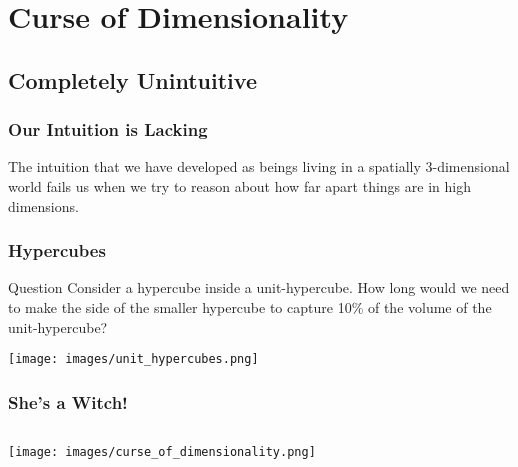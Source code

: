\documentclass{beamer}
\begin{document}
\section{Curse of Dimensionality}
\subsection{Completely Unintuitive}
\begin{frame}
  \frametitle{Our Intuition is Lacking}
  The intuition that we have developed as beings living in a spatially 3-dimensional world fails us when we try to reason about how far apart things are in high dimensions. \vspace{4mm}
\end{frame}

\begin{frame}
  \frametitle{Hypercubes}
  \begin{block}{Question}
    Consider a hypercube inside a unit-hypercube. How long would we need to make the side of the smaller hypercube to capture 10\% of the volume of the unit-hypercube?
  \end{block} \vspace{2mm} \pause

  \texttt{[image: images/unit\_hypercubes.png]}
\end{frame}
\begin{frame}
  \frametitle{She's a Witch!}
  \begin{columns}
    \texttt{[image: images/curse\_of\_dimensionality.png]}
  \end{columns}
\end{frame}
\end{document}
